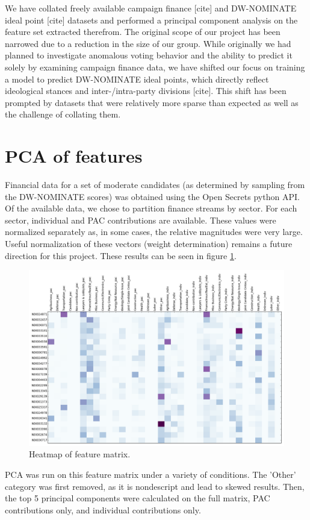 \documentclass[10]{article}
\begin{document}
We have collated freely available campaign finance [cite] and DW-NOMINATE ideal point [cite] datasets and performed a principal component analysis on the feature set extracted therefrom. The original scope of our project has been narrowed due to a reduction in the size of our group. While originally we had planned to investigate anomalous voting behavior and the ability to predict it solely by examining campaign finance data, we have shifted our focus on training a model to predict DW-NOMINATE ideal points, which directly reflect ideological stances and inter-/intra-party divisions [cite]. This shift has been prompted by datasets that were relatively more sparse than expected as well as the challenge of collating them.\\

\section*{PCA of features}
Financial data for a set of moderate candidates (as determined by sampling from the DW-NOMINATE scores) was obtained using the Open Secrets python API.  Of the available data, we chose to partition finance streams by sector.  For each sector, individual and PAC contributions are available.  These values were normalized separately as, in some cases, the relative magnitudes were very large.  Useful normalization of these vectors (weight determination) remains a future direction for this project.  These results can be seen in figure \ref{fig:fmtrx}.
\begin{figure}[H]
\centering
\includegraphics[width=.9\textwidth]{../../data/features/visualize/features.png}
\caption{\label{fig:fmtrx}Heatmap of feature matrix.}
\end{figure}
PCA was run on this feature matrix under a variety of conditions.  The 'Other' category was first removed, as it is nondescript and lead to skewed results.  Then, the top 5 principal components were calculated on the full matrix, PAC contributions only, and individual contributions only.
\end{document}
